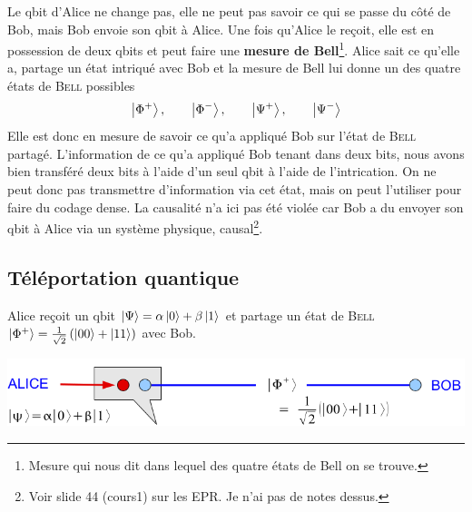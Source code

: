 Le qbit d'Alice ne change pas, elle ne peut pas savoir ce qui se passe du côté de Bob,
mais Bob envoie son qbit à Alice. Une fois qu'Alice le reçoit, elle est en possession
de deux qbits et peut faire une \textbf{mesure de Bell}\footnote{Mesure qui nous dit dans
lequel des quatre états de Bell on se trouve.}. Alice sait ce qu'elle a, partage
un état intriqué avec Bob et la mesure de Bell lui donne un des quatre états de \textsc{Bell} 
possibles
\begin{equation}
\ket{\Phi^+},\qquad\ket{\Phi^-},\qquad\ket{\Psi^+},\qquad\ket{\Psi^-}
\end{equation}
Elle est donc en mesure de savoir ce qu'a appliqué Bob sur l'état de \textsc{Bell} partagé. 
L'information de ce qu'a appliqué Bob tenant dans deux bits, nous avons bien transféré deux
bits à l'aide d'un seul qbit à l'aide de l'intrication. On ne peut donc pas transmettre 
d'information via cet état, mais on peut l'utiliser pour faire du codage dense. La causalité
n'a ici pas été violée car Bob a du envoyer son qbit à Alice via un système physique, 
causal\footnote{Voir slide 44 (cours1) sur les EPR. Je n'ai pas de notes dessus.}.


\subsection{Téléportation quantique}
Alice reçoit un qbit $\ket{\Psi} = \alpha\ket0+\beta\ket1$ et partage un état de \textsc{Bell}
$\ket{\Phi^+} = \frac{1}{\sqrt{2}}\left(\ket{00}+\ket{11}\right)$ avec Bob.
\begin{center}
	\includegraphics[scale=0.4]{ch2/image7}
\end{center}

